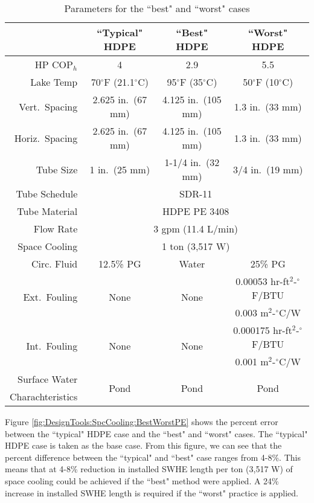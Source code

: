 	\begin{table}[h]
		\centering
		\caption{Parameters for the ``best" and ``worst" cases}
		\label{tab:DesignTools:SpcCooling:BestWorstParam}
		\begin{tabular}{r c c c}
		\hline
		& ``Typical" HDPE & ``Best" HDPE & ``Worst" HDPE \\
		\hline\hline
		HP $\mbox{COP}_h$ & 4 & 2.9 & 5.5 \\
		\hline
		Lake Temp & 70$^\circ$F (21.1$^\circ$C) & 95$^\circ$F (35$^\circ$C) & 50$^\circ$F (10$^\circ$C) \\
		\hline
		Vert.\ Spacing & 2.625 in.\ (67 mm) & 4.125 in.\ (105 mm) & 1.3 in.\ (33 mm)\\
		\hline
		Horiz.\ Spacing & 2.625 in.\ (67 mm) & 4.125 in.\ (105 mm) & 1.3 in.\ (33 mm) \\
		\hline
		Tube Size & 1 in.\ (25 mm) & 1-1/4 in.\ (32 mm) & 3/4 in.\ (19 mm) \\
		\hline
		Tube Schedule & \multicolumn{3}{c}{SDR-11} \\
		\hline
		Tube Material & \multicolumn{3}{c}{HDPE PE 3408} \\
		\hline
		Flow Rate & \multicolumn{3}{c}{3 gpm (11.4 L/min)} \\
		\hline
		Space Cooling & \multicolumn{3}{c}{1 ton (3,517 W)} \\
		\hline
		Circ. Fluid & 12.5\% PG & Water & 25\% PG \\
		\hline
		\multirow{2}{*}{Ext.\ Fouling} & \multirow{2}{*}{None} & \multirow{2}{*}{None} & 0.00053 hr-ft$^2$-$^\circ$F/BTU \\
		 & & & 0.003 m$^2$-$^\circ$C/W \\
		\hline
		\multirow{2}{*}{Int.\ Fouling} & \multirow{2}{*}{None} & \multirow{2}{*}{None} & 0.000175 hr-ft$^2$-$^\circ$F/BTU \\
		 & & & 0.001 m$^2$-$^\circ$C/W \\
		 \hline
		Surface Water & \multirow{2}{*}{Pond} & \multirow{2}{*}{Pond} & \multirow{2}{*}{Pond} \\
		Charachteristics & & & \\
		\hline
		\end{tabular}
	\end{table}
	
Figure \ref{fig:DesignTools:SpcCooling:BestWorstPE} shows the percent error between the ``typical" HDPE case and the ``best" and ``worst" cases. The ``typical" HDPE case is taken as the base case. From this figure, we can see that the percent difference between the ``typical" and ``best" case ranges from 4-8\%. This means that at 4-8\% reduction in installed SWHE length per ton (3,517 W) of space cooling could be achieved if the ``best" method were applied. A 24\% increase in installed SWHE length is required if the ``worst" practice is applied.
	
